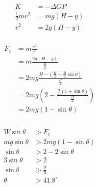 \documentclass[12pt,a4paper]{article}
\begin{document}
\[\begin{aligned}
	K&=-\Delta GP\\
	\frac12mv^2&=mg(H-y)\\
	v^2&=2g(H-y)
\end{aligned}\]
\\
\[\begin{aligned}
	F_c&=m\frac{v^2}r\\
	&=m\frac{2g(H-y)}{\frac H2}\\
	&=2mg\frac{H-\left(\frac H2+\frac H2\sin\theta\right)}{\frac H2}\\
	&=2mg\left(2-\frac{\frac H2(1+\sin\theta)}{\frac H2}\right)\\
	&=2mg\left(1-\sin\theta\right)\\
\end{aligned}\]
\\
\[\begin{aligned}
	W\sin\theta&>F_c\\
	mg\sin\theta&>2mg\left(1-\sin\theta\right)\\
	\sin\theta&>2-2\sin\theta\\
	3\sin\theta&>2\\
	\sin\theta&>\frac23\\
	\theta&>\boxed{41.8^\circ}
\end{aligned}\]
\end{document}
